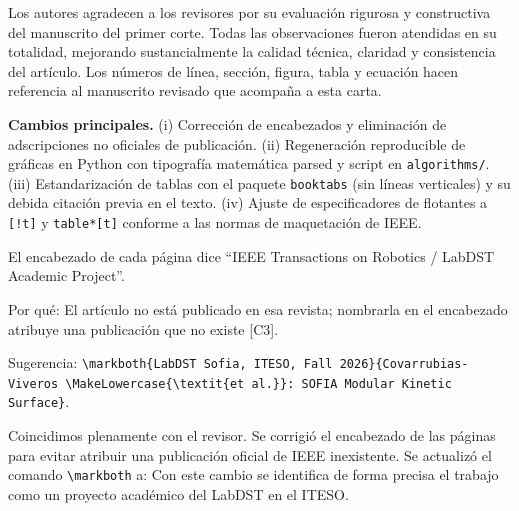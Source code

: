 \documentclass{LabDSTresponse}
\begin{document}


Los autores agradecen a los revisores por su evaluación rigurosa y constructiva del manuscrito del primer corte. Todas las observaciones fueron atendidas en su totalidad, mejorando sustancialmente la calidad técnica, claridad y consistencia del artículo. Los números de línea, sección, figura, tabla y ecuación hacen referencia al manuscrito revisado que acompaña a esta carta.

\textbf{Cambios principales.} (i) Corrección de encabezados y eliminación de adscripciones no oficiales de publicación. (ii) Regeneración reproducible de gráficas en Python con tipografía matemática parsed y script en \texttt{algorithms/}. (iii) Estandarización de tablas con el paquete \texttt{booktabs} (sin líneas verticales) y su debida citación previa en el texto. (iv) Ajuste de especificadores de flotantes a \texttt{[!t]} y \texttt{table*[t]} conforme a las normas de maquetación de IEEE.

\LabDSTsummary


{El encabezado de cada página dice “IEEE Transactions on Robotics / LabDST Academic Project”.

Por qué: El artículo no está publicado en esa revista; nombrarla en el encabezado atribuye una publicación que no existe [C3].

Sugerencia: \texttt{\textbackslash markboth\{LabDST Sofia, ITESO, Fall 2026\}\{Covarrubias-Viveros \textbackslash MakeLowercase\{\textbackslash textit\{et al.\}\}: SOFIA Modular Kinetic Surface\}}.}
{Coincidimos plenamente con el revisor. Se corrigió el encabezado de las páginas para evitar atribuir una publicación oficial de IEEE inexistente. Se actualizó el comando \texttt{\textbackslash markboth} a:
Con este cambio se identifica de forma precisa el trabajo como un proyecto académico del LabDST en el ITESO.}
\end{document}
